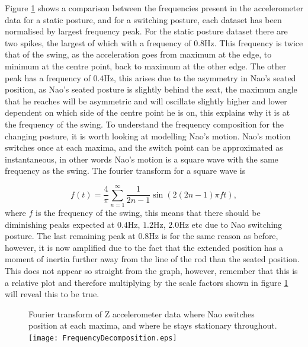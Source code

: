 \documentclass[11pt]{article}
\begin{document}
Figure \ref{fig:FrequencyDecomposition} shows a comparison between the frequencies present in the accelerometer data for a static posture, and for a switching posture, each dataset has been normalised by largest frequency peak. For the static posture dataset there are two spikes, the largest of which with a frequency of $0.8$Hz. This frequency is twice that of the swing, as the acceleration goes from maximum at the edge, to minimum at the centre point, back to maximum at the other edge. The other peak has a frequency of $0.4$Hz, this arises due to the asymmetry in Nao's seated position, as Nao's seated posture is slightly behind the seat, the maximum angle that he reaches will be asymmetric and will oscillate slightly higher and lower dependent on which side of the centre point he is on, this explains why it is at the frequency of the swing. To understand the frequency composition for the changing posture, it is worth looking at modelling Nao's motion. Nao's motion switches once at each maxima, and the switch point can be approximated as instantaneous, in other words Nao's motion is a square wave with the same frequency as the swing. The fourier transform for a square wave is

\begin{equation}
    f(t) = \frac{4}{\pi}\sum_{n=1}^{\infty} \frac{1}{2n-1}\sin(2(2n-1)\pi ft),
\end{equation}
where $f$ is the frequency of the swing, this means that there should be diminishing peaks expected at $0.4$Hz, $1.2$Hz, $2.0$Hz etc due to Nao switching posture. The last remaining peak at $0.8$Hz is for the same reason as before, however, it is now amplified due to the fact that the extended position has a moment of inertia further away from the line of the rod than the seated position. This does not appear so straight from the graph, however, remember that this is a relative plot and therefore multiplying by the scale factors shown in figure \ref{fig:FrequencyDecomposition} will reveal this to be true.\\

    \begin{figure}[!htb]
        \centering
        \captionbox
             {Fourier transform of Z accelerometer data where Nao switches position at each maxima, and where he stays stationary throughout.\label{fig:FrequencyDecomposition}}
             {\texttt{[image: FrequencyDecomposition.eps]}}
    \end{figure}
\end{document}
